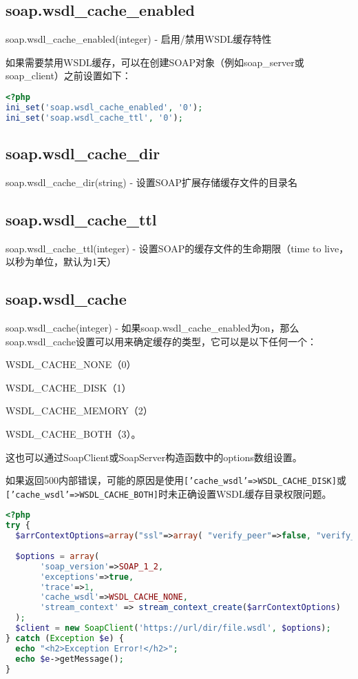 \subsection{soap.wsdl\_cache\_enabled}

soap.wsdl\_cache\_enabled(integer) - 启用/禁用WSDL缓存特性

如果需要禁用WSDL缓存，可以在创建SOAP对象（例如soap\_server或soap\_client）之前设置如下：

\begin{lstlisting}[language=PHP]
<?php
ini_set('soap.wsdl_cache_enabled', '0');
ini_set('soap.wsdl_cache_ttl', '0'); 
\end{lstlisting}

\subsection{soap.wsdl\_cache\_dir}

soap.wsdl\_cache\_dir(string) - 设置SOAP扩展存储缓存文件的目录名

\subsection{soap.wsdl\_cache\_ttl}

soap.wsdl\_cache\_ttl(integer) - 设置SOAP的缓存文件的生命期限（time to live，以秒为单位，默认为1天）

\subsection{soap.wsdl\_cache}

soap.wsdl\_cache(integer) - 如果soap.wsdl\_cache\_enabled为on，那么soap.wsdl\_cache设置可以用来确定缓存的类型，它可以是以下任何一个：

\begin{compactitem}
\item WSDL\_CACHE\_NONE（0）
\item WSDL\_CACHE\_DISK（1）
\item WSDL\_CACHE\_MEMORY（2）
\item WSDL\_CACHE\_BOTH（3）。
\end{compactitem}

这也可以通过SoapClient或SoapServer构造函数中的options数组设置。

如果返回500内部错误，可能的原因是使用\texttt{['cache\_wsdl'=>WSDL\_CACHE\_DISK]}或\texttt{['cache\_wsdl'=>WSDL\_CACHE\_BOTH]}时未正确设置WSDL缓存目录权限问题。

\begin{lstlisting}[language=PHP]
<?php
try {
  $arrContextOptions=array("ssl"=>array( "verify_peer"=>false, "verify_peer_name"=>false,'crypto_method' => STREAM_CRYPTO_METHOD_TLS_CLIENT));
       
  $options = array(
       'soap_version'=>SOAP_1_2,
       'exceptions'=>true,
       'trace'=>1,
       'cache_wsdl'=>WSDL_CACHE_NONE,
       'stream_context' => stream_context_create($arrContextOptions)
  );
  $client = new SoapClient('https://url/dir/file.wsdl', $options); 
} catch (Exception $e) {
  echo "<h2>Exception Error!</h2>";
  echo $e->getMessage();
}
\end{lstlisting}

